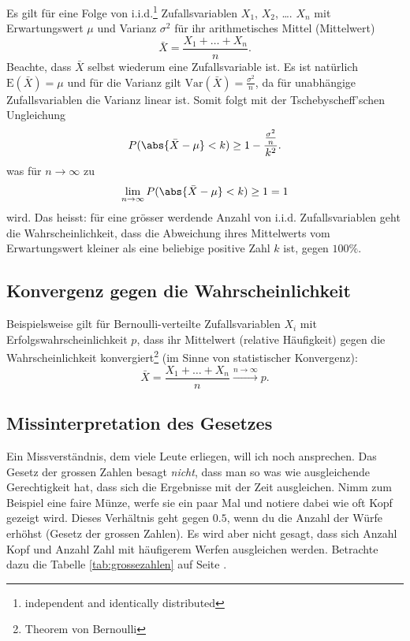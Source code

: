 \documentclass[%
11pt,%
twoside,%
titlepage,%
german,%
headsepline%
]{scrartcl}
\begin{document}
Es gilt für eine Folge von i.i.d.\footnote{independent and identically distributed} Zufallsvariablen $X_1$, $X_2$, \dots. $X_n$ mit Erwartungswert $\mu$ und Varianz $\sigma^2$ für ihr arithmetisches Mittel (Mittelwert)
$$\bar{X}=\frac{X_1+\dots+X_n}{n}.$$
Beachte, dass $\bar{X}$ selbst wiederum eine Zufallsvariable ist. Es ist natürlich $\mathrm{E}(\bar{X})=\mu$ und für die Varianz gilt $\mathrm{Var}(\bar{X})=\frac{\sigma^2}{n}$, da für unabhängige Zufallsvariablen die Varianz linear ist. Somit folgt mit der Tschebyscheff'schen Ungleichung
$$P(\abs{\bar{X}-\mu}<k) \geq 1-\frac{\frac{\sigma^2}{n}}{k^2}.$$
was für $n\to\infty$ zu
$$\lim_{n\to\infty}P(\abs{\bar{X}-\mu}<k) \geq 1=1$$
wird. Das heisst: für eine grösser werdende Anzahl von i.i.d. Zufallsvariablen geht die Wahrscheinlichkeit, dass die Abweichung ihres Mittelwerts vom Erwartungswert kleiner als eine beliebige positive Zahl $k$ ist, gegen $100\%$.

\subsection{Konvergenz gegen die Wahrscheinlichkeit}

Beispielsweise gilt für Bernoulli-verteilte Zufallsvariablen $X_i$ mit Erfolgswahrscheinlichkeit $p$, dass ihr Mittelwert (relative Häufigkeit) gegen die Wahrscheinlichkeit konvergiert\footnote{Theorem von Bernoulli} (im Sinne von statistischer Konvergenz):
$$\bar{X}=\frac{X_1+\dots+X_n}{n}\stackrel{n\to\infty}{\longrightarrow}p.$$



\subsection{Missinterpretation des Gesetzes}

Ein Missverständnis, dem viele Leute erliegen, will ich noch ansprechen. Das Gesetz der grossen Zahlen besagt \emph{nicht}, dass man so was wie ausgleichende Gerechtigkeit hat, dass sich die Ergebnisse mit der Zeit ausgleichen. Nimm zum Beispiel eine faire Münze, werfe sie ein paar Mal und notiere dabei wie oft Kopf gezeigt wird. Dieses Verhältnis geht gegen $0.5$, wenn du die Anzahl der Würfe erhöhst (Gesetz der grossen Zahlen). Es wird aber nicht gesagt, dass sich Anzahl Kopf und Anzahl Zahl mit häufigerem Werfen ausgleichen werden. Betrachte dazu die Tabelle \ref{tab:grossezahlen} auf Seite \pageref{tab:grossezahlen}.
\end{document}
